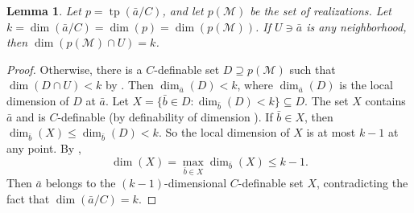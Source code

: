 \documentclass{amsart}
\newtheorem{lemma}[theorem]{Lemma}
\theoremstyle{definition}
\newcommand{\tp}{\operatorname{tp}}
\begin{document}
\begin{lemma} \label{wj-close-conjugates}
  Let $p = \tp(\bar{a}/C)$, and let $p(\mathcal{M})$ be the set of realizations.
  Let $k = \dim(\bar{a}/C) = \dim(p) = \dim(p(\mathcal{M}))$.  If $U \ni \bar{a}$ is
  any neighborhood, then $\dim(p(\mathcal{M}) \cap U) = k$.
\end{lemma}
\begin{proof}
  Otherwise, there is a $C$-definable set $D \supseteq p(\mathcal{M})$ such
  that $\dim(D \cap U) < k$ by \cite[Corollary~2.42]{t-minimal-johnson}.  Then
  $\dim_{\bar{a}}(D) < k$, where $\dim_{\bar{a}}(D)$ is the local dimension of $D$
  at $\bar{a}$.  Let $X = \{\bar{b} \in D : \dim_{\bar{b}}(D) < k\} \subseteq D$.
  The set $X$ contains $\bar{a}$ and is $C$-definable (by definability of dimension \cite[Theorem~2.51]{t-minimal-johnson}).  If $\bar{b} \in X$, then $\dim_{\bar{b}}(X) \le
  \dim_{\bar{b}}(D) < k$.  So the local dimension of $X$ is at most $k-1$ at
  any point.  By \cite[Proposition~3.10]{t-minimal-johnson},
  \begin{equation*}
    \dim(X) = \max_{\bar{b} \in X} \dim_{\bar{b}}(X) \le k-1.
  \end{equation*}
  Then $\bar{a}$ belongs to the $(k-1)$-dimensional $C$-definable set $X$,
  contradicting the fact that $\dim(\bar{a}/C) = k$.
\end{proof}
\end{document}
